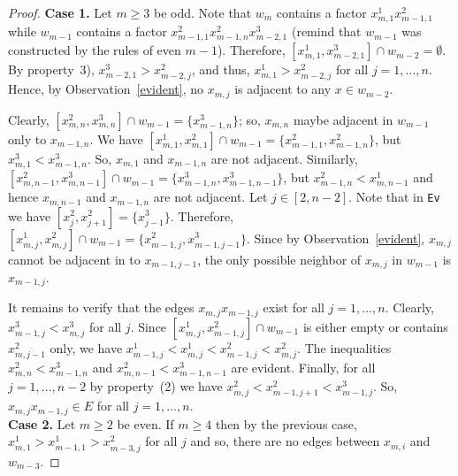 \documentclass[11pt]{article}
\begin{document}
\begin{proof}
\noindent
{\bf Case 1.} Let $m\ge 3$ be odd. Note that $w_m$ contains a factor  $ x_{m,1}^1x_{m-1,1}^2$ while $w_{m-1}$ contains a factor $x_{m-1,1}^2x_{m-1,n}^2x_{m-2,1}^3$ (remind that  $w_{m-1}$ was constructed by the rules of even $m-1$). Therefore, $[x_{m,1}^1,x_{m-2,1}^3]\cap w_{m-2}=\emptyset.$ By property~3), $x_{m-2,1}^3>x_{m-2,j}^2$, and thus,
 $x_{m,1}^1>x_{m-2,j}^2$ for all $j=1,\ldots,n$. Hence, by Observation~\ref{evident}, no $x_{m,j}$ is adjacent to any $x\in w_{m-2}$.

Clearly, $[x_{m,n}^2,x_{m,n}^3]\cap w_{m-1}=\{x_{m-1,n}^3\}$; so, $x_{m,n}$ maybe adjacent in $w_{m-1}$ only to $x_{m-1,n}$. We have $[x_{m,1}^1,x_{m,1}^2]\cap w_{m-1} =
\{ x_{m-1,1}^2,x_{m-1,n}^2 \}$, but $x_{m,1}^3<x_{m-1,n}^3$. So, $x_{m,1}$ and $x_{m-1,n}$ are not adjacent. Similarly, 
$[x_{m,n-1}^2,x_{m,n-1}^3]\cap w_{m-1} = \{ x_{m-1,n}^3,x_{m-1,n-1}^3 \}$, but $x_{m-1,n}^2<x_{m,n-1}^1$ and hence  $x_{m,n-1}$ and $x_{m-1,n}$ are not adjacent. 
Let $j\in [2,n-2]$. Note that in  \texttt{Ev} we have $[x_j^2,x_{j+1}^2] =\{ x_{j-1}^3\}$. Therefore, $[x_{m,j}^1,x_{m,j}^2]\cap w_{m-1} =\{ x_{m-1,j}^2,x_{m-1,j-1}^3\}$.
Since by Observation~\ref{evident}, $x_{m,j}$ cannot be adjacent in to $x_{m-1,j-1}$, the only possible neighbor of  $x_{m,j}$ in $w_{m-1}$ is $x_{m-1,j}$.

It remains to verify that the edges $x_{m,j}x_{m-1,j}$ exist for all $j=1,\ldots,n$. Clearly,  $x_{m-1,j}^3<x_{m,j}^3$ for all $j$. Since
$[x_{m,j}^1,x_{m-1,j}^2]\cap w_{m-1}$ is either empty or contains $x_{m,j-1}^2$ only, we have $x_{m-1,j}^1<x_{m,j}^1<x_{m-1,j}^2<x_{m,j}^2$. 
The inequalities $x_{m,n}^2<x_{m-1,n}^3$ and  $x_{m,n-1}^2<x_{m-1,n-1}^3$ are evident. Finally, for all $j=1,\ldots,n-2$ by property~(2) we have
$x_{m,j}^2<x_{m-1,j+1}^2<x_{m-1,j}^3$.  So, $x_{m,j}x_{m-1,j}\in E$  for all $j=1,\ldots, n$. \\[-3mm]

\noindent
{\bf Case 2. } Let $m\ge 2$ be even. If $m\ge 4$ then by the previous case, $x_{m,1}^1>x_{m-1,1}^1>x_{m-3,j}^2$ for all $j$ and so, there are no edges between 
 $x_{m,i}$ and $w_{m-3}$. 


\end{proof}
\end{document}
